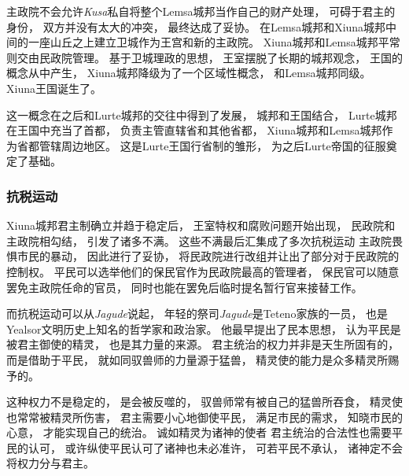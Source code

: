 \documentclass[UTF8,12pt]{ctexbook}
\begin{document}
                主政院不会允许\emph{Kusa}私自将整个Lemsa城邦当作自己的财产处理，
                可碍于君主的身份，
                双方并没有太大的冲突，
                最终达成了妥协。
                在Lemsa城邦和Xiuna城邦中间的一座山丘之上建立卫城作为王宫和新的主政院。
                Xiuna城邦和Lemsa城邦平常则交由民政院管理。
                基于卫城理政的思想，
                王室摆脱了长期的城邦观念，
                王国的概念从中产生，
                Xiuna城邦降级为了一个区域性概念，
                和Lemsa城邦同级。
                Xiuna王国诞生了。

                这一概念在之后和Lurte城邦的交往中得到了发展，
                城邦和王国结合，
                Lurte城邦在王国中充当了首都，
                负责主管直辖省和其他省都，
                Xiuna城邦和Lemsa城邦作为省都管辖周边地区。
                这是Lurte王国行省制的雏形，
                为之后Lurte帝国的征服奠定了基础。
                \subsubsection{抗税运动}
                Xiuna城邦君主制确立并趋于稳定后，
                王室特权和腐败问题开始出现，
                民政院和主政院相勾结，
                引发了诸多不满。
                这些不满最后汇集成了多次抗税运动
                主政院畏惧市民的暴动，
                因此进行了妥协，
                将民政院进行改组并让出了部分对于民政院的控制权。
                平民可以选举他们的保民官作为民政院最高的管理者，
                保民官可以随意罢免主政院任命的官员，
                同时也能在罢免后临时提名暂行官来接替工作。

                而抗税运动可以从\emph{Jagude}说起，
                年轻的祭司\emph{Jagude}是Teteno家族的一员，
                也是Yealsor文明历史上知名的哲学家和政治家。
                他最早提出了民本思想，
                认为平民是被君主御使的精灵，
                也是其力量的来源。
                君主统治的权力并非是天生所固有的，
                而是借助于平民，
                就如同驭兽师的力量源于猛兽，
                精灵使的能力是众多精灵所赐予的。

                这种权力不是稳定的，
                是会被反噬的，
                驭兽师常有被自己的猛兽所吞食，
                精灵使也常常被精灵所伤害，
                君主需要小心地御使平民，
                满足市民的需求，
                知晓市民的心意，
                才能实现自己的统治。
                诚如精灵为诸神的使者
                君主统治的合法性也需要平民的认可，
                或许纵使平民认可了诸神也未必准许，
                可若平民不承认，
                诸神定不会将权力分与君主。
\end{document}
